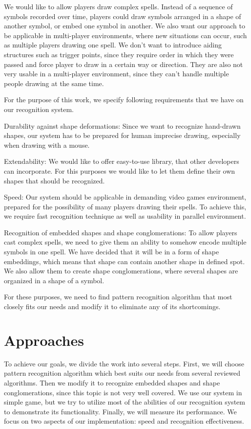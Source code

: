 We would like to allow players draw complex spells. Instead of a sequence of symbols recorded over time, players could draw symbols arranged in a shape of another symbol, or embed one symbol in another. We also want our approach to be applicable in multi-player environments, where new situations can occur, such as multiple players drawing one spell. We don't want to introduce aiding structures such as trigger points, since they require order in which they were passed and force player to draw in a certain way or direction. They are also not very usable in a multi-player environment, since they can't handle multiple people drawing at the same time.

For the purpose of this work, we specify following requirements that we have on our recognition system. 

Durability against shape deformations: Since we want to recognize hand-drawn shapes, our system has to be prepared for human imprecise drawing, especially when drawing with a mouse.

Extendability: We would like to offer easy-to-use library, that other developers can incorporate. For this purposes we would like to let them define their own shapes that should be recognized.

Speed: Our system should be applicable in demanding video games environment, prepared for the possibility of many players drawing their spells. To achieve this, we require fast recognition technique as well as usability in parallel environment.

Recognition of embedded shapes and shape conglomerations: To allow players cast complex spells, we need to give them an ability to somehow encode multiple symbols in one spell. We have decided that it will be in a form of shape embeddings, which means that shape can contain another shape in defined spot. We also allow them to create shape conglomerations, where several shapes are organized in a shape of a symbol.

For these purposes, we need to find pattern recognition algorithm that most closely fits our needs and modify it to eliminate any of its shortcomings.

\section{Approaches}

To achieve our goals, we divide the work into several steps. First, we will choose pattern recognition algorithm which best suits our needs from several reviewed algorithms. Then we modify it to recognize embedded shapes and shape conglomerations, since this topic is not very well covered. We use our system in simple game, but we try to utilize most of the abilities of our recognition system to demonstrate its functionality. Finally, we will measure its performance. We focus on two aspects of our implementation: speed and recognition effectiveness.

